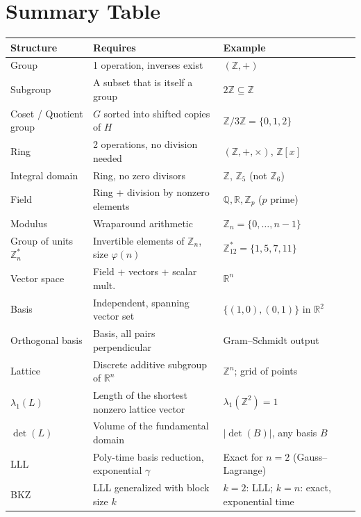 \section{Summary Table}
\label{sec:L1:summary-table}

\begin{center}
\renewcommand{\arraystretch}{1.3}
\begin{tabular}{|l|l|l|}
\hline
\textbf{Structure} & \textbf{Requires} & \textbf{Example} \\
\hline
Group & 1 operation, inverses exist & $(\mathbb{Z}, +)$ \\
Subgroup & A subset that is itself a group & $2\mathbb{Z} \subseteq \mathbb{Z}$ \\
Coset / Quotient group & $G$ sorted into shifted copies of $H$ & $\mathbb{Z}/3\mathbb{Z} = \{0,1,2\}$ \\
Ring & 2 operations, no division needed & $(\mathbb{Z}, +, \times)$, $\mathbb{Z}[x]$ \\
Integral domain & Ring, no zero divisors & $\mathbb{Z}$, $\mathbb{Z}_5$ (not $\mathbb{Z}_6$) \\
Field & Ring + division by nonzero elements & $\mathbb{Q}, \mathbb{R}, \mathbb{Z}_p$ ($p$ prime) \\
Modulus & Wraparound arithmetic & $\mathbb{Z}_n = \{0,\ldots,n-1\}$ \\
Group of units $\mathbb{Z}_n^*$ & Invertible elements of $\mathbb{Z}_n$, size $\varphi(n)$ & $\mathbb{Z}_{12}^* = \{1,5,7,11\}$ \\
Vector space & Field + vectors + scalar mult. & $\mathbb{R}^n$ \\
Basis & Independent, spanning vector set & $\{(1,0),(0,1)\}$ in $\mathbb{R}^2$ \\
Orthogonal basis & Basis, all pairs perpendicular & Gram--Schmidt output \\
Lattice & Discrete additive subgroup of $\mathbb{R}^n$ & $\mathbb{Z}^n$; grid of points \\
$\lambda_1(L)$ & Length of the shortest nonzero lattice vector & $\lambda_1(\mathbb{Z}^2) = 1$ \\
$\det(L)$ & Volume of the fundamental domain & $|\det(B)|$, any basis $B$ \\
LLL & Poly-time basis reduction, exponential $\gamma$ & Exact for $n=2$ (Gauss--Lagrange) \\
BKZ & LLL generalized with block size $k$ & $k=2$: LLL; $k=n$: exact, exponential time \\
\hline
\end{tabular}
\end{center}

